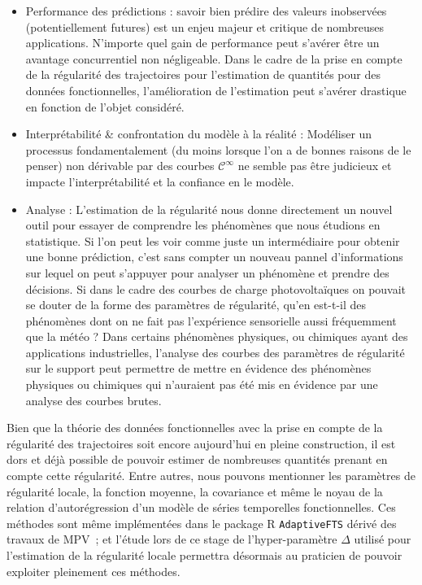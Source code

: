 \begin{itemize}
	\item Performance des prédictions : savoir bien prédire des valeurs inobservées (potentiellement futures) est un enjeu majeur et critique de nombreuses applications. N'importe quel gain de performance peut s'avérer être un avantage concurrentiel non négligeable. Dans le cadre de la prise en compte de la régularité des trajectoires pour l'estimation de quantités pour des données fonctionnelles, l'amélioration de l'estimation peut s'avérer drastique en fonction de l'objet considéré. 
	\item Interprétabilité \& confrontation du modèle à la réalité : Modéliser un processus fondamentalement (du moins lorsque l'on a de bonnes raisons de le penser) non dérivable par des courbes $\mathcal C^\infty$ ne semble pas être judicieux et impacte l'interprétabilité et la confiance en le modèle.
	\item Analyse : L'estimation de la régularité nous donne directement un nouvel outil pour essayer de comprendre les phénomènes que nous étudions en statistique. Si l'on peut les voir comme juste un intermédiaire pour obtenir une bonne prédiction, c'est sans compter un nouveau pannel d'informations sur lequel on peut s'appuyer pour analyser un phénomène et prendre des décisions. Si dans le cadre des courbes de charge photovoltaïques on pouvait se douter de la forme des paramètres de régularité, qu'en est-t-il des phénomènes dont on ne fait pas l'expérience sensorielle aussi fréquemment que la météo ? Dans certains phénomènes physiques, ou chimiques ayant des applications industrielles, l'analyse des courbes des paramètres de régularité sur le support peut permettre de mettre en évidence des phénomènes physiques ou chimiques qui n'auraient pas été mis en évidence par une analyse des courbes brutes.
\end{itemize}

\bigskip

Bien que la théorie des données fonctionnelles avec la prise en compte de la régularité des trajectoires soit encore aujourd'hui en pleine construction, il est dors et déjà possible de pouvoir estimer de nombreuses quantités prenant en compte cette régularité. Entre autres, nous pouvons mentionner les paramètres de régularité locale, la fonction moyenne, la covariance et même le noyau de la relation d'autorégression d'un modèle de séries temporelles fonctionnelles. Ces méthodes sont même implémentées dans le package R \texttt{AdaptiveFTS} dérivé des travaux de MPV~\cite{maissoro-SmoothnessFTSweakDep}; et l'étude lors de ce stage de l'hyper-paramètre $\Delta$ utilisé pour l'estimation de la régularité locale permettra désormais au praticien de pouvoir exploiter pleinement ces méthodes.